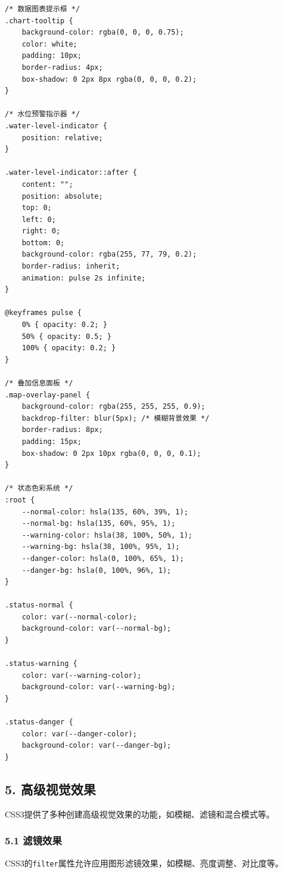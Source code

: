 \begin{lstlisting}
/* 数据图表提示框 */
.chart-tooltip {
    background-color: rgba(0, 0, 0, 0.75);
    color: white;
    padding: 10px;
    border-radius: 4px;
    box-shadow: 0 2px 8px rgba(0, 0, 0, 0.2);
}

/* 水位预警指示器 */
.water-level-indicator {
    position: relative;
}

.water-level-indicator::after {
    content: "";
    position: absolute;
    top: 0;
    left: 0;
    right: 0;
    bottom: 0;
    background-color: rgba(255, 77, 79, 0.2);
    border-radius: inherit;
    animation: pulse 2s infinite;
}

@keyframes pulse {
    0% { opacity: 0.2; }
    50% { opacity: 0.5; }
    100% { opacity: 0.2; }
}

/* 叠加信息面板 */
.map-overlay-panel {
    background-color: rgba(255, 255, 255, 0.9);
    backdrop-filter: blur(5px); /* 模糊背景效果 */
    border-radius: 8px;
    padding: 15px;
    box-shadow: 0 2px 10px rgba(0, 0, 0, 0.1);
}

/* 状态色彩系统 */
:root {
    --normal-color: hsla(135, 60%, 39%, 1);
    --normal-bg: hsla(135, 60%, 95%, 1);
    --warning-color: hsla(38, 100%, 50%, 1);
    --warning-bg: hsla(38, 100%, 95%, 1);
    --danger-color: hsla(0, 100%, 65%, 1);
    --danger-bg: hsla(0, 100%, 96%, 1);
}

.status-normal {
    color: var(--normal-color);
    background-color: var(--normal-bg);
}

.status-warning {
    color: var(--warning-color);
    background-color: var(--warning-bg);
}

.status-danger {
    color: var(--danger-color);
    background-color: var(--danger-bg);
}
\end{lstlisting}

\subsection{5. 高级视觉效果}\label{ux9ad8ux7ea7ux89c6ux89c9ux6548ux679c}

CSS3提供了多种创建高级视觉效果的功能，如模糊、滤镜和混合模式等。

\subsubsection{5.1 滤镜效果}\label{ux6ee4ux955cux6548ux679c}

CSS3的\passthrough{\lstinline!filter!}属性允许应用图形滤镜效果，如模糊、亮度调整、对比度等。

